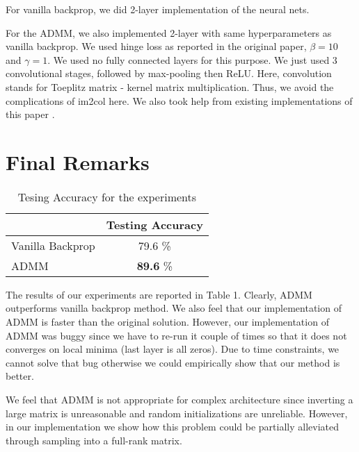 \documentclass[12pt]{article}
\begin{document}
For vanilla backprop, we did 2-layer implementation of the neural nets.

For the ADMM, we also implemented 2-layer with same hyperparameters as vanilla backprop.
We used hinge loss as reported in the original paper, $\beta = 10$ and $\gamma = 1$.
We used no fully connected layers for this purpose.
We just used 3 convolutional stages, followed by max-pooling then ReLU.
Here, convolution stands for Toeplitz matrix - kernel matrix multiplication.
Thus, we avoid the complications of im2col here.
We also took help from existing implementations of this paper \cite{dongzhuoyao}.

\section{Final Remarks}

\begin{table}[h]
	\centering
	\label{my-label}
	\begin{tabular}{@{}lc@{}}
		\toprule
		\textbf{}        & \textbf{Testing Accuracy} \\ \midrule
		Vanilla Backprop & 79.6 \%                   \\
		ADMM             & \textbf{89.6} \%                   \\ \bottomrule
	\end{tabular}
\caption{Tesing Accuracy for the experiments}
\end{table}

The results of our experiments are reported in Table 1.
Clearly, ADMM outperforms vanilla backprop method.
We also feel that our implementation of ADMM is faster than the original solution.
However, our implementation of ADMM was buggy since we have to re-run it couple of times so that it does not converges on local minima (last layer is all zeros).
Due to time constraints, we cannot solve that bug otherwise we could empirically show that our method is better.

We feel that ADMM is not appropriate for complex architecture since inverting a large matrix is unreasonable and random initializations are unreliable.
However, in our implementation we show how this problem could be partially alleviated through sampling into a full-rank matrix.



\end{document}
